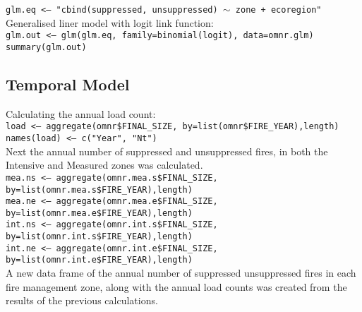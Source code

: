 \begin{spacing}{1.5}
\noindent \texttt{glm.eq <-- "cbind(suppressed, unsuppressed) $\sim$ zone + ecoregion"} \\

\noindent Generalised liner model with logit link function: \\

\noindent \texttt{glm.out <-- glm(glm.eq, family=binomial(logit), data=omnr.glm)} \\

\noindent \texttt{summary(glm.out)}

\subsection{Temporal Model}
Calculating the annual load count: \\

\noindent \texttt{load <-- aggregate(omnr\$FINAL\_SIZE, by=list(omnr\$FIRE\_YEAR),length)} \\

\noindent \texttt{names(load) <-- c("Year", "Nt")} \\

\noindent Next the annual number of suppressed and unsuppressed fires, in both the Intensive and Measured zones was calculated. \\

\noindent \texttt{mea.ns <-- aggregate(omnr.mea.s\$FINAL\_SIZE, by=list(omnr.mea.s\$FIRE\_\linebreak YEAR),length)} \\

\noindent \texttt{mea.ne <-- aggregate(omnr.mea.e\$FINAL\_SIZE, by=list(omnr.mea.e\$FIRE\_\linebreak YEAR),length)} \\

\noindent \texttt{int.ns <-- aggregate(omnr.int.s\$FINAL\_SIZE, by=list(omnr.int.s\$FIRE\_\linebreak YEAR),length)} \\

\noindent \texttt{int.ne <-- aggregate(omnr.int.e\$FINAL\_SIZE, by=list(omnr.int.e\$FIRE\_\linebreak YEAR),length)} \\

\noindent A new data frame of the annual number of suppressed unsuppressed fires in each fire management zone, along with the annual load counts was created from the results of the previous calculations. \\


\end{spacing}
